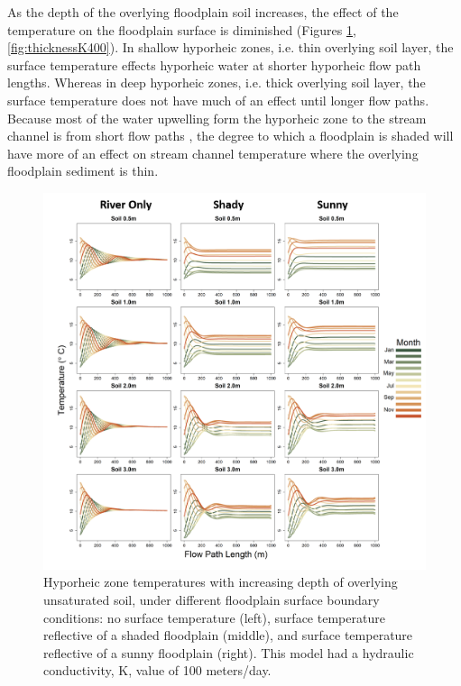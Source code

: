 \documentclass[letterpaper, 11pt]{article}
\begin{document}
As the depth of the overlying floodplain soil increases, the effect of the temperature on the floodplain surface is diminished (Figures \ref{fig:thicknessK100}, \ref{fig:thicknessK400}). In shallow hyporheic zones, i.e. thin overlying soil layer, the surface temperature effects hyporheic water at shorter hyporheic flow path lengths. Whereas in deep hyporheic zones, i.e. thick overlying soil layer, the surface temperature does not have much of an effect until longer flow paths. Because most of the water upwelling form the hyporheic zone to the stream channel is from short flow paths \cite{Cardenas2008ResidenceExchange}, the degree to which a floodplain is shaded will have more of an effect on stream channel temperature where the overlying floodplain sediment is thin.

\begin{figure}
    \centering
    \includegraphics{Figures/compare_thickness_and_shade_k_100_w_riveronly_finalized.png}
    \caption{Hyporheic zone temperatures with increasing depth of overlying unsaturated soil, under different floodplain surface boundary conditions: no surface temperature (left), surface temperature reflective of a shaded floodplain (middle), and surface temperature reflective of a sunny floodplain (right). This model had a hydraulic conductivity, K, value of 100 meters/day.}
    \label{fig:thicknessK100}
\end{figure}
\end{document}
